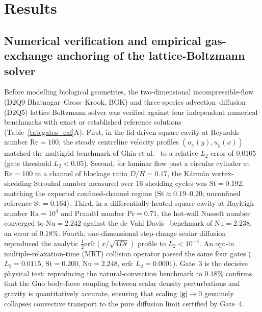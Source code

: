 \documentclass[final,5p,times,twocolumn,numbers,sort&compress]{elsarticle}
\begin{document}
\section{Results}\label{sec:results}

\subsection{Numerical verification and empirical gas-exchange anchoring of the lattice-Boltzmann solver}\label{sec:validation}

Before modelling biological geometries, the two-dimensional incompressible-flow (D2Q9 Bhatnagar--Gross--Krook, BGK) and three-species advection--diffusion (D2Q5) lattice-Boltzmann solver was verified against four independent numerical benchmarks with exact or established reference solutions (Table~\ref{tab:gates_cal}A). First, in the lid-driven square cavity at Reynolds number $\mathrm{Re} = 100$, the steady centreline velocity profiles $(u_x(y), u_y(x))$ matched the multigrid benchmark of Ghia et al.~\citep{ghia1982} to a relative $L_2$ error of $0.0105$ (gate threshold $L_2 < 0.05$). Second, for laminar flow past a circular cylinder at $\mathrm{Re} = 100$ in a channel of blockage ratio $D/H = 0.17$, the K\'arm\'an vortex-shedding Strouhal number measured over 16 shedding cycles was $\mathrm{St} = 0.192$, matching the expected confined-channel regime ($\mathrm{St}\approx 0.19\text{--}0.20$; unconfined reference $\mathrm{St} = 0.164$). Third, in a differentially heated square cavity at Rayleigh number $\mathrm{Ra} = 10^4$ and Prandtl number $\mathrm{Pr} = 0.71$, the hot-wall Nusselt number converged to $\mathrm{Nu} = 2.242$ against the de Vahl Davis~\citep{devahldavis1983} benchmark of $\mathrm{Nu} = 2.238$, an error of $0.18\%$. Fourth, one-dimensional step-change scalar diffusion reproduced the analytic $\tfrac{1}{2}\mathrm{erfc}(x/\sqrt{4Dt})$ profile to $L_2 < 10^{-4}$. An opt-in multiple-relaxation-time (MRT) collision operator \citep{lallemand2000} passed the same four gates ($L_2 = 0.0115$, $\mathrm{St} = 0.200$, $\mathrm{Nu} = 2.248$, $\mathrm{erfc}$ $L_2 = 0.0001$). Gate~3 is the decisive physical test: reproducing the natural-convection benchmark to $0.18\%$ confirms that the Guo body-force coupling \citep{guo2002} between scalar density perturbations and gravity is quantitatively accurate, ensuring that scaling $|\mathbf{g}|\to 0$ genuinely collapses convective transport to the pure diffusion limit certified by Gate~4.
\end{document}
